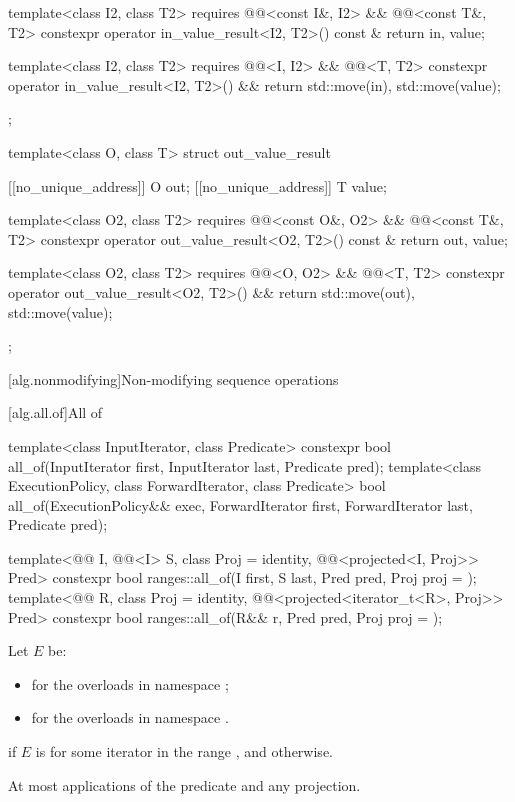 \begin{codeblock}
{{    template<class I2, class T2>
      requires @@<const I&, I2> && @@<const T&, T2>
    constexpr operator in_value_result<I2, T2>() const & {
      return {in, value};
    }

    template<class I2, class T2>
      requires @@<I, I2> && @@<T, T2>
    constexpr operator in_value_result<I2, T2>() && {
      return {std::move(in), std::move(value)};
    }
  };

  template<class O, class T>
  struct out_value_result {
    [[no_unique_address]] O out;
    [[no_unique_address]] T value;

    template<class O2, class T2>
      requires @@<const O&, O2> && @@<const T&, T2>
    constexpr operator out_value_result<O2, T2>() const & {
      return {out, value};
    }

    template<class O2, class T2>
      requires @@<O, O2> && @@<T, T2>
    constexpr operator out_value_result<O2, T2>() && {
      return {std::move(out), std::move(value)};
    }
  };
}
\end{codeblock}

[alg.nonmodifying]{Non-modifying sequence operations}

[alg.all.of]{All of}

%
\begin{itemdecl}
template<class InputIterator, class Predicate>
  constexpr bool all_of(InputIterator first, InputIterator last, Predicate pred);
template<class ExecutionPolicy, class ForwardIterator, class Predicate>
  bool all_of(ExecutionPolicy&& exec, ForwardIterator first, ForwardIterator last,
              Predicate pred);

template<@@ I, @@<I> S, class Proj = identity,
         @@<projected<I, Proj>> Pred>
  constexpr bool ranges::all_of(I first, S last, Pred pred, Proj proj = {});
template<@@ R, class Proj = identity,
         @@<projected<iterator_t<R>, Proj>> Pred>
  constexpr bool ranges::all_of(R&& r, Pred pred, Proj proj = {});
\end{itemdecl}

\begin{itemdescr}
\pnum
Let $E$ be:
\begin{itemize}
\item
   for the overloads in namespace ;
\item
  for the overloads in namespace .
\end{itemize}

\pnum
\returns
{} if $E$ is 
for some iterator  in the range , and
 otherwise.

\pnum
\complexity
At most  applications of the predicate and any projection.
\end{itemdescr}

